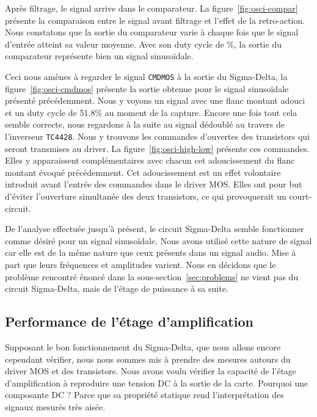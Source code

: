 \documentclass[10pt, oneside, a4paper]{article}
\begin{document}
Après filtrage, le signal arrive dans le comparateur.
La figure~\ref{fig:osci-compar} présente la comparaison entre le signal avant filtrage et l'effet de la retro-action.
Nous constatons que la sortie du comparateur varie à chaque fois que le signal d'entrée atteint sa valeur moyenne.
Avec son duty cycle de \%, la sortie du comparateur représente bien un signal sinusoïdale.

Ceci nous amènes à regarder le signal \texttt{CMDMOS} à la sortie du Sigma-Delta, la figure~\ref{fig:osci-cmdmos} présente la sortie obtenue pour le signal sinusoïdale présenté précédemment.
Nous y voyons un signal avec une flanc montant adouci et un duty cycle de \num{51.8}\% au moment de la capture.
Encore une fois tout cela semble correcte, nous regardons à la suite au signal dédoublé au travers de l'inverseur \texttt{TC4428}.
Nous y trouvons les commandes d'ouvertes des transistors qui seront transmises au driver.
La figure~\ref{fig:osci-high-low} présente ces commandes.
Elles y apparaissent complémentaires avec chacun cet adoucissement du flanc montant évoqué précédemment.
Cet adoucissement est un effet volontaire introduit avant l'entrée des commandes dans le driver MOS.
Elles ont pour but d'éviter l'ouverture simultanée des deux transistors, ce qui provoquerait un court-circuit.

De l'analyse effectuée jusqu'à présent, le circuit Sigma-Delta semble fonctionner comme désiré pour un signal sinusoïdale.
Nous avons utilisé cette nature de signal car elle est de la même nature que ceux présents dans un signal audio.
Mise à part que leurs fréquences et amplitudes varient.
Nous en décidons que le problème rencontré énoncé dans la sous-section~\ref{sec:problems} ne vient pas du circuit Sigma-Delta, mais de l'étage de puissance à sa suite.

\subsection{Performance de l'étage d'amplification}
Supposant le bon fonctionnement du Sigma-Delta, que nous allons encore cependant vérifier, nous nous sommes mis à prendre des mesures autours du driver MOS et des transistors.
Nous avons voulu vérifier la capacité de l'étage d'amplification à reproduire une tension DC à la sortie de la carte.
Pourquoi une composante DC ?
Parce que sa propriété statique rend l'interprétation des signaux mesurés très aisée.
\end{document}
